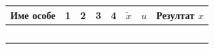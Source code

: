 \documentclass[10pt]{article}
\begin{document}

\begin{table}[htbp]
  \centering
  \renewcommand{\arraystretch}{1.8}
  \begin{tabularx}{\textwidth}{|p{2.8cm}|>{\centering\arraybackslash}X|>{\centering\arraybackslash}X|>{\centering\arraybackslash}X|>{\centering\arraybackslash}X|>{\centering\arraybackslash}X|>{\centering\arraybackslash}X|c|}
    \hline
    \hline
    \textbf{Име особе} \hspace{0.8 cm} & \textbf{1} & \textbf{2} & \textbf{3} & \textbf{4} &  $\tilde{x}$ & $u$ & \textbf{Резултат $x$}  \\ \hline
    & \hspace{1.1cm} & \hspace{1.1cm} & \hspace{1.1cm} & \hspace{1.1cm} & \hspace{0.8 cm} &  \hspace{0.8 cm} &  \hspace{1.6cm} \\ \hline
    & & & & &  & & \\ \hline
    & & & & & & & \\ \hline
    & & & & & & & \\ \hline
    & & & & & & & \\ \hline
  \end{tabularx}
\end{table}
\end{document}
